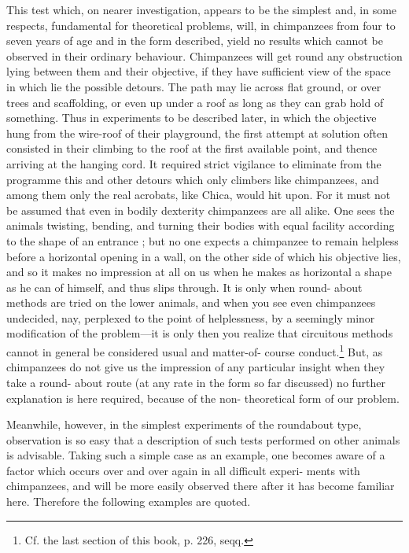 \documentclass{article}
\begin{document}
This test which, on nearer investigation, appears to be
the simplest and, in some respects, fundamental for theoretical problems, will, in chimpanzees from four to seven years of
age and in the form described, yield no results which cannot
be observed in their ordinary behaviour. Chimpanzees
will get round any obstruction lying between them and
their objective, if they have sufficient view of the space
in which lie the possible detours. The path may lie across
flat ground, or over trees and scaffolding, or even up under
a roof as long as they can grab hold of something. Thus in
experiments to be described later, in which the objective 
hung from the wire-roof of their playground, the first attempt
at solution often consisted in their climbing to the roof at
the first available point, and thence arriving at the hanging
cord. It required strict vigilance to eliminate from the
programme this and other detours which only climbers
like chimpanzees, and among them only the real acrobats,
like Chica, would hit upon. For it must not be assumed
that even in bodily dexterity chimpanzees are all alike.
One sees the animals twisting, bending, and turning their
bodies with equal facility according to the shape of an
entrance ; but no one expects a chimpanzee to remain helpless
before a horizontal opening in a wall, on the other side of
which his objective lies, and so it makes no impression at all on us when he makes as horizontal a shape as he can
of himself, and thus slips through. It is only when round-
about methods are tried on the lower animals, and when
you see even chimpanzees undecided, nay, perplexed to the
point of helplessness, by a seemingly minor modification
of the problem—it is only then you realize that circuitous
methods cannot in general be considered usual and matter-of-
course conduct.\footnote{Cf. the last section of this book, p. 226, seqq.
} But, as chimpanzees do not give us the
impression of any particular insight when they take a round-
about route (at any rate in the form so far discussed) no
further explanation is here required, because of the non-
theoretical form of our problem.

Meanwhile, however, in the simplest experiments of the
roundabout type, observation is so easy that a description
of such tests performed on other animals is advisable. Taking
such a simple case as an example, one becomes aware of a
factor which occurs over and over again in all difficult experi-
ments with chimpanzees, and will be more easily observed
there after it has become familiar here. Therefore the
following examples are quoted.
\end{document}
